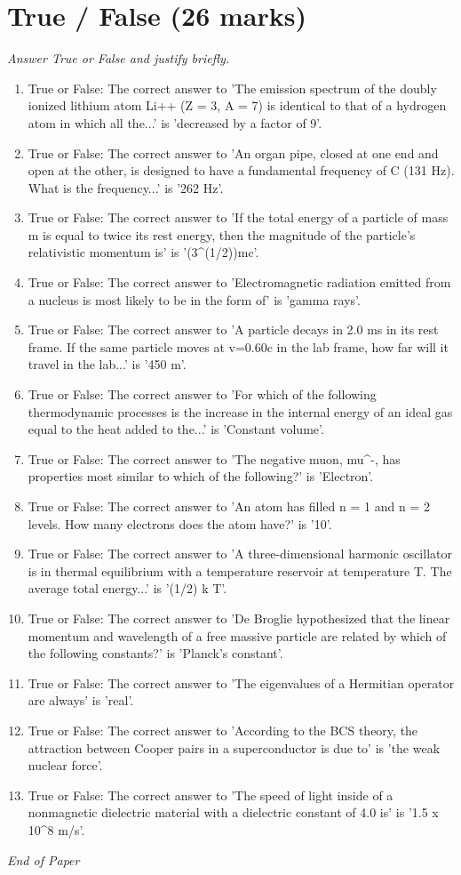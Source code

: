 \documentclass[12pt]{article}
\begin{document}
\section*{True / False (26 marks)}
\textit{Answer True or False and justify briefly.}
\begin{enumerate}[label=\arabic*.]
\item True or False: The correct answer to 'The emission spectrum of the doubly ionized lithium atom Li++ (Z = 3, A = 7) is identical to that of a hydrogen atom in which all the...' is 'decreased by a factor of 9'.
\item True or False: The correct answer to 'An organ pipe, closed at one end and open at the other, is designed to have a fundamental frequency of C (131 Hz). What is the frequency...' is '262 Hz'.
\item True or False: The correct answer to 'If the total energy of a particle of mass m is equal to twice its rest energy, then the magnitude of the particle's relativistic momentum is' is '(3\^{}(1/2))mc'.
\item True or False: The correct answer to 'Electromagnetic radiation emitted from a nucleus is most likely to be in the form of' is 'gamma rays'.
\item True or False: The correct answer to 'A particle decays in 2.0 ms in its rest frame. If the same particle moves at v=0.60c in the lab frame, how far will it travel in the lab...' is '450 m'.
\item True or False: The correct answer to 'For which of the following thermodynamic processes is the increase in the internal energy of an ideal gas equal to the heat added to the...' is 'Constant volume'.
\item True or False: The correct answer to 'The negative muon, mu\^{}-, has properties most similar to which of the following?' is 'Electron'.
\item True or False: The correct answer to 'An atom has filled n = 1 and n = 2 levels. How many electrons does the atom have?' is '10'.
\item True or False: The correct answer to 'A three-dimensional harmonic oscillator is in thermal equilibrium with a temperature reservoir at temperature T. The average total energy...' is '(1/2) k T'.
\item True or False: The correct answer to 'De Broglie hypothesized that the linear momentum and wavelength of a free massive particle are related by which of the following constants?' is 'Planck's constant'.
\item True or False: The correct answer to 'The eigenvalues of a Hermitian operator are always' is 'real'.
\item True or False: The correct answer to 'According to the BCS theory, the attraction between Cooper pairs in a superconductor is due to' is 'the weak nuclear force'.
\item True or False: The correct answer to 'The speed of light inside of a nonmagnetic dielectric material with a dielectric constant of 4.0 is' is '1.5 x 10\^{}8 m/s'.
\end{enumerate}

\vfill
\noindent\textit{End of Paper}
\end{document}
